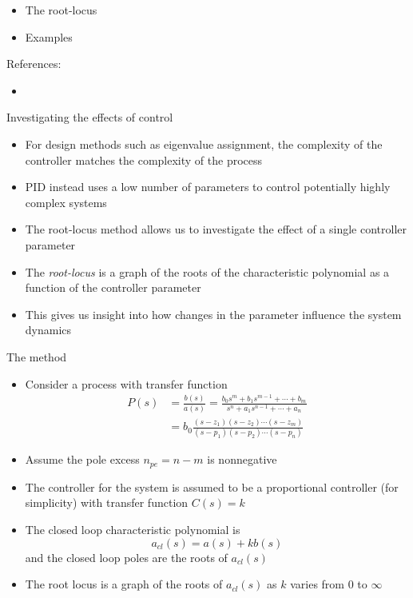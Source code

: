 \documentclass{beamer-control}
\begin{document}

\begin{SUMMARY}
\begin{itemize}
\item The root-locus
\item Examples
\end{itemize}
\vfill References:
\begin{itemize}
\item {}
\end{itemize}
\end{SUMMARY}




\begin{frame}{Investigating the effects of control}
\begin{itemize}
\item For design methods such as eigenvalue assignment, the complexity of the controller matches the complexity of the process
\item PID instead uses a low number of parameters to control potentially highly complex systems
\item The root-locus method allows us to investigate the effect of a single controller parameter
\item The \textit{root-locus} is a graph of the roots of the characteristic polynomial as a function of the controller parameter
\item This gives us insight into how changes in the parameter influence the system dynamics
\end{itemize}
\end{frame}

\begin{frame}{The method}
\begin{itemize}
	\item Consider a process with transfer function
	\begin{align*}
		P(s) &= \frac{b(s)}{a(s)} = \frac{b_0s^m+b_1s^{m-1}+\cdots + b_m}{s^n+a_1s^{n-1}+\cdots + a_n} \\
		&= b_0\frac{(s-z_1)(s-z_2)\cdots (s-z_m)}{(s-p_1)(s-p_2)\cdots(s-p_n)}
	\end{align*}
	\item Assume the pole excess $n_{pe}=n-m$ is nonnegative
	\item The controller for the system is assumed to be a proportional controller (for simplicity) with transfer function $C(s)=k$
		\item The closed loop characteristic polynomial is 
\[a_{cl}(s)=a(s)+kb(s)\]
and the closed loop poles are the roots of $a_{cl}(s)$
\item The root locus is a graph of the roots of $a_{cl}(s)$ as $k$ varies from $0$ to $\infty$
\end{itemize}
\end{frame}
\end{document}
